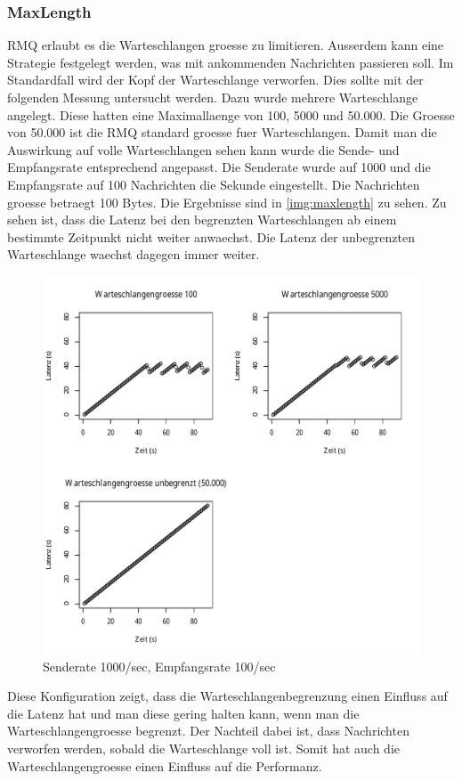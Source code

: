 \subsubsection{MaxLength}
\label{subsub:maxlength}
RMQ erlaubt es die Warteschlangen groesse zu limitieren. Ausserdem kann eine Strategie festgelegt werden, was mit ankommenden Nachrichten passieren soll. Im Standardfall wird der Kopf der Warteschlange verworfen. Dies sollte mit der folgenden Messung untersucht werden. Dazu wurde mehrere Warteschlange angelegt. Diese hatten eine Maximallaenge von 100, 5000 und 50.000. Die Groesse von 50.000 ist die RMQ standard groesse fuer Warteschlangen. Damit man die Auswirkung auf volle Warteschlangen sehen kann wurde die Sende- und Empfangsrate entsprechend angepasst. Die Senderate wurde auf 1000 und die Empfangsrate auf 100 Nachrichten die Sekunde eingestellt. Die Nachrichten groesse betraegt 100 Bytes.
Die Ergebnisse sind in \autoref{img:maxlength} zu sehen. Zu sehen ist, dass die Latenz bei den begrenzten Warteschlangen ab einem bestimmte Zeitpunkt nicht weiter anwaechst. Die Latenz der unbegrenzten Warteschlange waechst dagegen immer weiter.
\begin{figure}
\center
  \includegraphics[width=1\textwidth]{images/measurement/max-length.pdf}
  \caption{Senderate 1000/sec, Empfangsrate 100/sec}
  \label{img:maxlength}
\end{figure}
Diese Konfiguration zeigt, dass die Warteschlangenbegrenzung einen Einfluss auf die Latenz hat und man diese gering halten kann, wenn man die Warteschlangengroesse begrenzt. Der Nachteil dabei ist, dass Nachrichten verworfen werden, sobald die Warteschlange voll ist. Somit hat auch die Warteschlangengroesse einen Einfluss auf die Performanz. 

